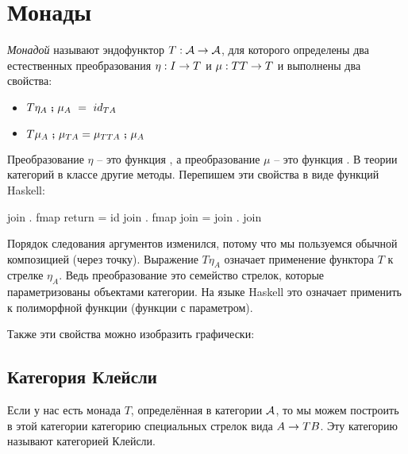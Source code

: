 \section{Монады}

\emph{Монадой} называют эндофунктор $T:\mathcal{A} \rightarrow \mathcal{A}$, для 
которого определены два естественных преобразования $\eta : I \rightarrow T$ и
$\mu : TT \rightarrow T$ и выполнены два свойства:

\begin{itemize}
\item $T \eta_A \Co \mu_{A} \ =\ id_{TA} $
\item $T \mu_A \footnotesize\textbf{~;~}\normalsize \mu_{TA} = \mu_{TTA} \footnotesize\textbf{~;~}\normalsize \mu_A$ 
\end{itemize}

Преобразование $\eta$ -- это функция , а 
преобразование $\mu$ -- это функция . В теории 
категорий в классе  другие методы. Перепишем эти
свойства в виде функций Haskell:

\begin{code}
join . fmap return   = id
join . fmap join     = join . join
\end{code}

Порядок следования аргументов изменился, потому что мы
пользуемся обычной композицией (через точку). 
Выражение $T \eta_A$ означает применение функтора 
$T$ к стрелке $\eta_A$. Ведь преобразование это семейство
стрелок, которые параметризованы объектами категории. 
На языке Haskell это означает применить  к
полиморфной функции (функции с параметром).

Также эти свойства можно изобразить графически:



\subsection{Категория Клейсли}

Если у нас есть монада $T$, определённая в категории $\mathcal{A}$,
то мы можем построить в этой категории категорию специальных
стрелок вида $A \rightarrow TB$. Эту категорию называют категорией Клейсли.

